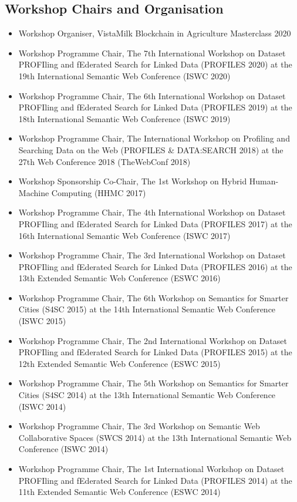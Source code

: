 \documentclass[10pt,a4paper]{res} %
\begin{document}
\begin{resume}
\subsection*{Workshop Chairs and Organisation}

\begin{itemize} \itemsep -2pt
\item Workshop Organiser, VistaMilk Blockchain in Agriculture Masterclass 2020
\item Workshop Programme Chair, The 7th International Workshop on Dataset PROFIling and fEderated Search for Linked Data (PROFILES 2020) at the 19th International Semantic Web Conference (ISWC 2020)
\item Workshop Programme Chair, The 6th International Workshop on Dataset PROFIling and fEderated Search for Linked Data (PROFILES 2019) at the 18th International Semantic Web Conference (ISWC 2019)
\item Workshop Programme Chair, The International Workshop on Profiling and Searching Data on the Web (PROFILES \& DATA:SEARCH 2018) at the 27th Web Conference 2018 (TheWebConf 2018)
\item Workshop Sponsorship Co-Chair, The 1st Workshop on Hybrid Human-Machine Computing (HHMC 2017)
\item Workshop Programme Chair, The 4th International Workshop on Dataset PROFIling and fEderated Search for Linked Data (PROFILES 2017) at the 16th International Semantic Web Conference (ISWC 2017)
\item Workshop Programme Chair, The 3rd International Workshop on Dataset PROFIling and fEderated Search for Linked Data (PROFILES 2016) at the 13th Extended Semantic Web Conference (ESWC 2016)
\item Workshop Programme Chair, The 6th Workshop on Semantics for Smarter Cities (S4SC 2015) at the 14th International Semantic Web Conference (ISWC 2015)
\item Workshop Programme Chair, The 2nd International Workshop on Dataset PROFIling and fEderated Search for Linked Data (PROFILES 2015) at the 12th Extended Semantic Web Conference (ESWC 2015)
\item Workshop Programme Chair, The 5th Workshop on Semantics for Smarter Cities (S4SC 2014) at the 13th International Semantic Web Conference (ISWC 2014)
\item Workshop Programme Chair, The 3rd Workshop on Semantic Web Collaborative Spaces (SWCS 2014) at the 13th International Semantic Web Conference (ISWC 2014)
\item Workshop Programme Chair, The 1st International Workshop on Dataset PROFIling and fEderated Search for Linked Data (PROFILES 2014) at the 11th Extended Semantic Web Conference (ESWC 2014)

\end{itemize}
\end{resume}
\end{document}
